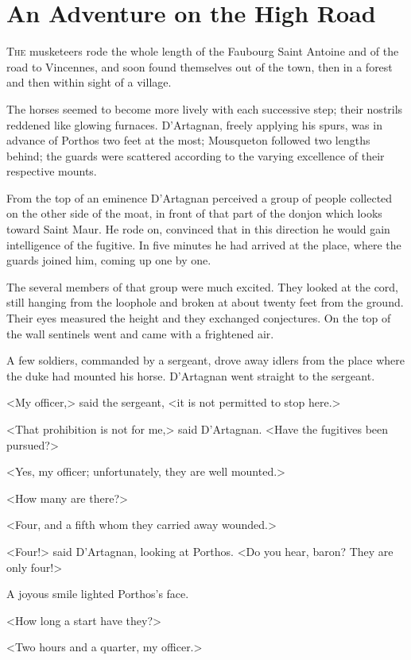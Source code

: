 \chapter{An Adventure on the High Road}

 \lettrine{T}{he} musketeers rode the whole length of the Faubourg Saint Antoine and of the road to Vincennes, and soon found themselves out of the town, then in a forest and then within sight of a village.

\zz
The horses seemed to become more lively with each successive step; their nostrils reddened like glowing furnaces. D'Artagnan, freely applying his spurs, was in advance of Porthos two feet at the most; Mousqueton followed two lengths behind; the guards were scattered according to the varying excellence of their respective mounts.

From the top of an eminence D'Artagnan perceived a group of people collected on the other side of the moat, in front of that part of the donjon which looks toward Saint Maur. He rode on, convinced that in this direction he would gain intelligence of the fugitive. In five minutes he had arrived at the place, where the guards joined him, coming up one by one.

The several members of that group were much excited. They looked at the cord, still hanging from the loophole and broken at about twenty feet from the ground. Their eyes measured the height and they exchanged conjectures. On the top of the wall sentinels went and came with a frightened air.

A few soldiers, commanded by a sergeant, drove away idlers from the place where the duke had mounted his horse. D'Artagnan went straight to the sergeant.

<My officer,> said the sergeant, <it is not permitted to stop here.>

<That prohibition is not for me,> said D'Artagnan. <Have the fugitives been pursued?>

<Yes, my officer; unfortunately, they are well mounted.>

<How many are there?>

<Four, and a fifth whom they carried away wounded.>

<Four!> said D'Artagnan, looking at Porthos. <Do you hear, baron? They are only four!>

A joyous smile lighted Porthos's face.

<How long a start have they?>

<Two hours and a quarter, my officer.>

